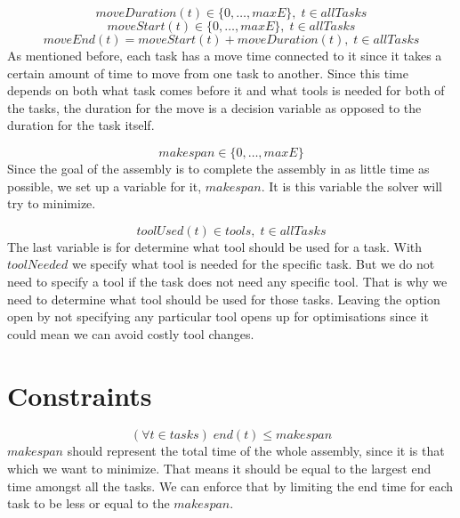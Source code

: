  \begin{equation}\label{eq:49}
 moveDuration(t) \in \{0 , \ldots , maxE\}, \; t \in allTasks
 \end{equation}
 \begin{equation}\label{eq:50}
 moveStart(t) \in \{0 , \ldots , maxE\}, \; t \in allTasks
 \end{equation}
 \begin{equation}\label{eq:51}
 moveEnd(t) = moveStart(t) + moveDuration(t), \; t \in allTasks
 \end{equation}
As mentioned before, each task has a move time connected to it since it takes a certain amount of time to move from one task to another. Since this time depends on both what task comes before it and what tools is needed for both of the tasks, the duration for the move is a decision variable as opposed to the duration for the task itself.
 
 \begin{equation}\label{eq:48}
 makespan \in \{0 , \ldots , maxE\}
 \end{equation}
Since the goal of the assembly is to complete the assembly in as little time as possible, we set up a variable for it, $makespan$. It is this variable the solver will try to minimize.
 
 \begin{equation}\label{eq:52}
 toolUsed(t) \in tools, \; t \in allTasks
 \end{equation}
The last variable is for determine what tool should be used for a task. With $toolNeeded$ we specify what tool is needed for the specific task. But we do not need to specify a tool if the task does not need any specific tool. That is why we need to determine what tool should be used for those tasks. Leaving the option open by not specifying any particular tool opens up for optimisations since it could mean we can avoid costly tool changes.
  
 
 \section{Constraints}\label{seq:constraints}
 
 \begin{equation}\label{eq:92}
 (\forall t \in tasks) \; end(t) \le makespan
 \end{equation}
$makespan$ should represent the total time of the whole assembly, since it is that which we want to minimize. That means it should be equal to the largest end time amongst all the tasks. We can enforce that by limiting the end time for each task to be less or equal to the $makespan$.
 
